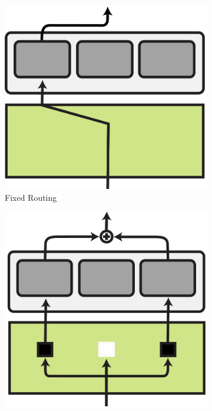 \documentclass[10pt]{article} %
\begin{document}
\begin{figure}[t]
    \centering
    \begin{subfigure}{.25\linewidth}
    \centering
        \vspace{1em}
        \includegraphics[width=.99\linewidth]{img/Deterministic_routing.pdf}
        \caption{Fixed Routing }
        \label{fig:routing:fixed_routing}
    \end{subfigure}
    \hspace{.5em}
    \begin{subfigure}{.25\linewidth}
    \centering
    \vspace{0.6em}
        \includegraphics[width=.99\linewidth]{img/Hard_routing.pdf}  

\end{subfigure}
\end{figure}
\end{document}
